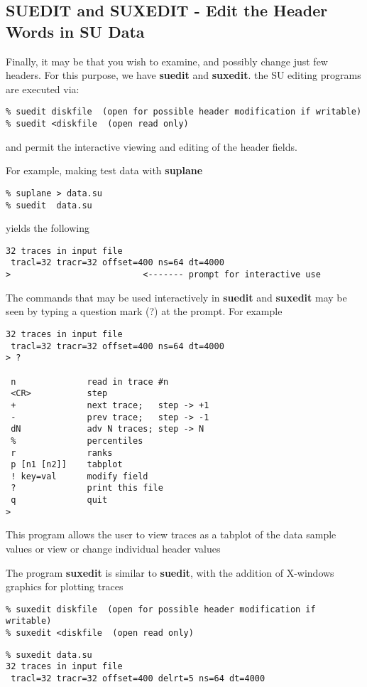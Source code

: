{{{\subsection{SUEDIT and SUXEDIT - Edit the Header Words in SU Data}

Finally, it may be that you wish to examine, and possibly change
just  few headers. For this purpose, we have {\bf suedit\/} and
{\bf suxedit}.
the SU editing programs are executed via:
{\small \begin{verbatim}
% suedit diskfile  (open for possible header modification if writable)	
% suedit <diskfile  (open read only)					
\end{verbatim}}\noindent
and permit the interactive viewing and editing of the header
fields.

For example, making test data with {\bf suplane\/}
{\small \begin{verbatim}
% suplane > data.su
% suedit  data.su
\end{verbatim}}\noindent
yields the following 
{\small \begin{verbatim}
32 traces in input file
 tracl=32 tracr=32 offset=400 ns=64 dt=4000
>                          <------- prompt for interactive use 
\end{verbatim}}\noindent

The commands that may be used interactively in {\bf suedit\/} and 
{\bf suxedit\/}
may be seen by typing a question mark (?) at the prompt. For
example
{\small \begin{verbatim}
32 traces in input file
 tracl=32 tracr=32 offset=400 ns=64 dt=4000
> ?

 n              read in trace #n
 <CR>           step
 +              next trace;   step -> +1
 -              prev trace;   step -> -1
 dN             adv N traces; step -> N
 %              percentiles
 r              ranks
 p [n1 [n2]]    tabplot
 ! key=val      modify field
 ?              print this file
 q              quit
>
\end{verbatim}}\noindent
This program allows the user to view traces as a tabplot of
the data sample values or view or change individual header values

The program {\bf suxedit\/} is similar to {\bf suedit}, with the addition
of X-windows graphics for plotting traces
{\small \begin{verbatim}
% suxedit diskfile  (open for possible header modification if writable)	
% suxedit <diskfile  (open read only)					
\end{verbatim}}\noindent
{\small \begin{verbatim}
% suxedit data.su
32 traces in input file
 tracl=32 tracr=32 offset=400 delrt=5 ns=64 dt=4000


\end{verbatim}}}}}
